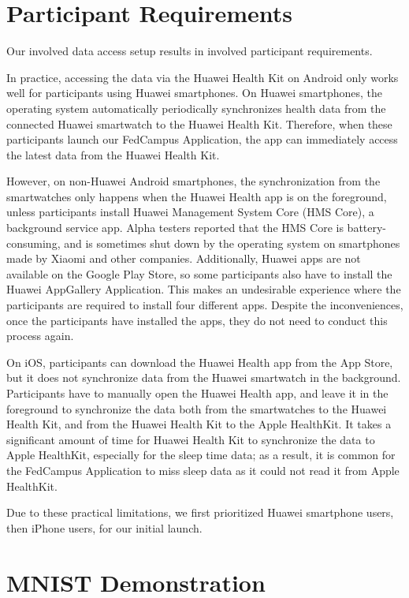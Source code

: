 \section{Participant Requirements}

Our involved data access setup results in involved participant requirements.

In practice, accessing the data via the Huawei Health Kit on Android only works
well for participants using Huawei smartphones.
On Huawei smartphones,
the operating system automatically periodically synchronizes health data from
the connected Huawei smartwatch to the Huawei Health Kit.
Therefore, when these participants launch our FedCampus Application,
the app can immediately access the latest data from the Huawei Health Kit.

However, on non-Huawei Android smartphones,
the synchronization from the smartwatches only happens when
the Huawei Health app is on the foreground,
unless participants install Huawei Management System Core (HMS Core),
a background service app.
Alpha testers reported that the HMS Core is battery-consuming,
and is sometimes shut down by the operating system on smartphones made by
Xiaomi and other companies.
Additionally, Huawei apps are not available on the Google Play Store,
so some participants also have to install the Huawei AppGallery Application.
This makes an undesirable experience where the participants are required to
install four different apps.
Despite the inconveniences, once the participants have installed the apps,
they do not need to conduct this process again.

On iOS, participants can download the Huawei Health app from the App Store,
but it does not synchronize data from the Huawei smartwatch in the background.
Participants have to manually open the Huawei Health app,
and leave it in the foreground to synchronize the data both from
the smartwatches to the Huawei Health Kit,
and from the Huawei Health Kit to the Apple HealthKit.
It takes a significant amount of time for Huawei Health Kit to
synchronize the data to Apple HealthKit,
especially for the sleep time data;
as a result, it is common for the FedCampus Application to miss sleep data as
it could not read it from Apple HealthKit.

Due to these practical limitations,
we first prioritized Huawei smartphone users, then iPhone users,
for our initial launch.

\section{\fedkit MNIST Demonstration}

